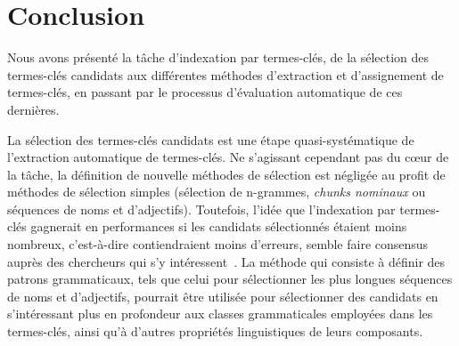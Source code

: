 


  \section{Conclusion}
  \label{sec:main-state_of_the_art-automatic_evaluation_of_keyphrase_annotation-conclusion}
    Nous avons présenté la tâche d'indexation par termes-clés, de la sélection
    des termes-clés candidats aux différentes méthodes d'extraction et
    d'assignement de termes-clés, en passant par le processus d'évaluation
    automatique de ces dernières.

    La sélection des termes-clés candidats est une étape quasi-systématique de
    l'extraction automatique de termes-clés. Ne s'agissant cependant pas du
    c\oe{}ur de la tâche, la définition de nouvelle méthodes de sélection est
    négligée au profit de méthodes de sélection simples (sélection de n-grammes,
    \textit{chunks nominaux} ou séquences de noms et d'adjectifs). Toutefois,
    l'idée que l'indexation par termes-clés gagnerait en performances si les
    candidats sélectionnés étaient moins nombreux, c'est-à-dire contiendraient
    moins d'erreurs, semble faire consensus auprès des chercheurs qui s'y
    intéressent~\cite{huang2006semanticnetworkstructureanalysis,wang2014keyphraseextractionpreprocessing}. La méthode qui
    consiste à définir des patrons grammaticaux, tels que celui pour
    sélectionner les plus longues séquences de noms et d'adjectifs, pourrait
    être utilisée pour sélectionner des candidats en s'intéressant plus en
    profondeur aux classes grammaticales employées dans les termes-clés, ainsi
    qu'à d'autres propriétés linguistiques de leurs composants.

